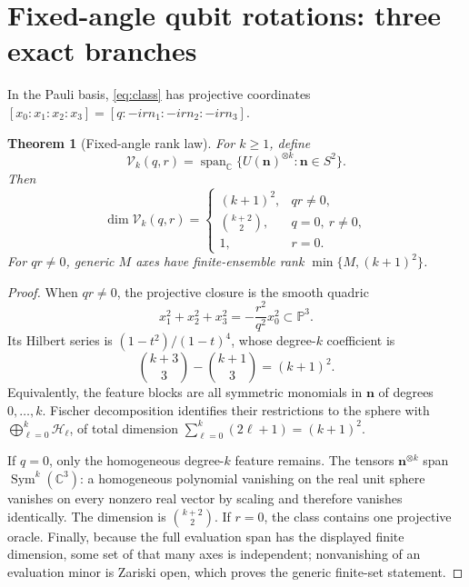 \documentclass[11pt]{article}
\newtheorem{theorem}{Theorem}[section]
\theoremstyle{definition}
\theoremstyle{remark}
\newcommand{\C}{\mathbb C}
\newcommand{\PP}{\mathbb P}
\newcommand{\Span}{\operatorname{span}}
\newcommand{\Sym}{\operatorname{Sym}}
\newcommand{\cH}{\mathcal H}
\newcommand{\cV}{\mathcal V}
\begin{document}
\section{Fixed-angle qubit rotations: three exact branches}

In the Pauli basis, \cref{eq:class} has projective coordinates
$[x_0:x_1:x_2:x_3]=[q:-irn_1:-irn_2:-irn_3]$.

\begin{theorem}[Fixed-angle rank law]\label{thm:ranklaw}
For $k\geq1$, define
\begin{equation}
 \cV_k(q,r)=\Span_\C\{U(\bm n)^{\otimes k}:\bm n\in S^2\}.
\end{equation}
Then
\begin{equation}\label{eq:ranklaw}
 \dim\cV_k(q,r)=
 \begin{cases}
 (k+1)^2,&qr\neq0,\\[2mm]
 \binom{k+2}{2},&q=0,\ r\neq0,\\[2mm]
 1,&r=0.
 \end{cases}
\end{equation}
For $qr\neq0$, generic $M$ axes have finite-ensemble rank
$\min\{M,(k+1)^2\}$.
\end{theorem}

\begin{proof}
When $qr\neq0$, the projective closure is the smooth quadric
\begin{equation}\label{eq:quadric}
 x_1^2+x_2^2+x_3^2=-\frac{r^2}{q^2}x_0^2\subset\PP^3.
\end{equation}
Its Hilbert series is $(1-t^2)/(1-t)^4$, whose degree-$k$ coefficient is
\begin{equation}
 \binom{k+3}{3}-\binom{k+1}{3}=(k+1)^2.
\end{equation}
Equivalently, the feature blocks are all symmetric monomials in $\bm n$ of
degrees $0,\ldots,k$.  Fischer decomposition identifies their restrictions
to the sphere with
$\bigoplus_{\ell=0}^k\cH_\ell$, of total dimension
$\sum_{\ell=0}^k(2\ell+1)=(k+1)^2$.

If $q=0$, only the homogeneous degree-$k$ feature remains.  The tensors
$\bm n^{\otimes k}$ span $\Sym^k(\C^3)$: a homogeneous polynomial vanishing
on the real unit sphere vanishes on every nonzero real vector by scaling and
therefore vanishes identically.  The dimension is $\binom{k+2}{2}$.  If
$r=0$, the class contains one projective oracle.  Finally, because the full
evaluation span has the displayed finite dimension, some set of that many
axes is independent; nonvanishing of an evaluation minor is Zariski open,
which proves the generic finite-set statement.
\end{proof}
\end{document}
